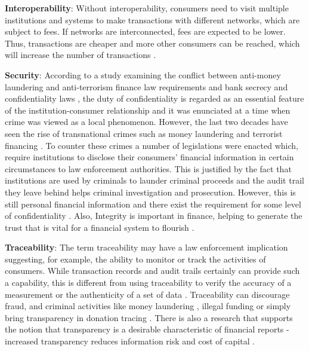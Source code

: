 \textbf{Interoperability}: Without interoperability, consumers need to visit multiple institutions and systems to make transactions with different networks, which are subject to fees. If networks are interconnected, fees are expected to be lower. Thus, transactions are cheaper and more other consumers can be reached, which will increase the number of transactions \cite{fin_interop}. \newline

\textbf{Security}: According to a study examining the conflict between anti-money laundering and anti-terrorism finance law requirements and bank secrecy and confidentiality laws \cite{confidentiality_conficts}, the duty of confidentiality is regarded as an essential feature of the institution-consumer relationship and it was enunciated at a time when crime was viewed as a local phenomenon. However, the last two decades have seen the rise of transnational crimes such as money laundering \cite{money_laundering} and terrorist financing \cite{illegal_funding}. To counter these crimes a number of legislations were enacted which, require institutions to disclose their consumers’ financial information in certain circumstances to law enforcement authorities. This is justified by the fact that institutions are used by criminals to launder criminal proceeds and the audit trail they leave behind helps criminal investigation and prosecution. However, this is still personal financial information and there exist the requirement for some level of confidentiality \cite{confidentiality_conficts}. Also, Integrity is important in finance, helping to generate the trust that is vital for a financial system to flourish \cite{fin_integrity_1,fin_integrity_2,fin_integrity_3}. \newline

\textbf{Traceability}: The term traceability may have a law enforcement implication suggesting, for example, the ability to monitor or track the activities of consumers. While transaction records and audit trails certainly can provide such a capability, this is different from using traceability to verify the accuracy of a measurement or the authenticity of a set of data \cite{trust_traceab_e_commerce}. Traceability can discourage fraud, and criminal activities like money laundering \cite{money_laundering}, illegal funding \cite{illegal_funding} or simply bring transparency in donation tracing \cite{finance_1,finance_2,finance_3}. There is also a research that supports the notion that transparency is a desirable characteristic of financial reports - increased transparency reduces information risk and cost of capital \cite{traceability_finance}. \newline

